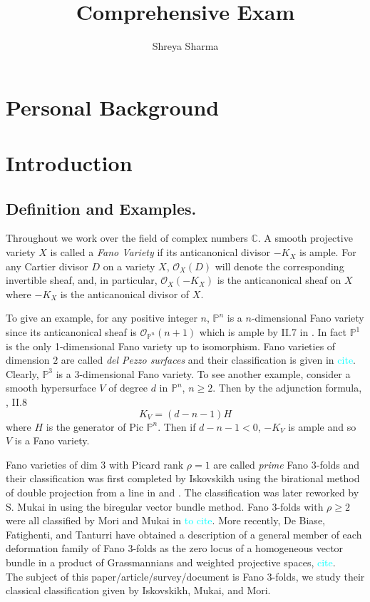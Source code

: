 \documentclass[11pt]{amsart}
\theoremstyle{plain}
\theoremstyle{definition}
\theoremstyle{expl}
\begin{document}
	\title{Comprehensive Exam}
	\date{}
	\author{\small{Shreya Sharma}}
	\maketitle
	\tableofcontents
	
\section{Personal Background}

\section{Introduction}
\subsection{Definition and Examples.} Throughout we work over the field of complex numbers $\mathbb{C}$.
A smooth projective variety $X$ is called a \textit{Fano Variety} if its anticanonical divisor $-K_X$ is ample.
For any Cartier divisor $D$ on a variety $X$, $\mathcal{O}_X(D)$ will denote the corresponding invertible sheaf, and, in particular, $\mathcal{O}_X(-K_X)$ is the anticanonical sheaf on $X$ where $-K_X$ is the anticanonical divisor of $X$. 

	To give an example, for any positive integer $n$,  $\mathbb{P}^n$ is a $n$-dimensional Fano variety since its anticanonical sheaf is $\mathcal{O}_{\mathbb{P}^n}(n+1)$ which is ample by II.7 in \cite{Hartshorne}. In fact $\mathbb{P}^1$ is the only 1-dimensional Fano variety up to isomorphism. Fano varieties of dimension $2$ are called \textit{del Pezzo surfaces} and their classification is given in \textcolor{cyan}{cite}. Clearly, $\mathbb{P}^3$ is a $3$-dimensional Fano variety. To see another example, consider a smooth hypersurface $V$ of degree $d$ in $\mathbb{P}^n$, $n \geq 2$. Then by the adjunction formula, \cite{Hartshorne}, II.8
	\[
	K_V = (d-n-1)H
	\]
    where $H$ is the generator of Pic $\mathbb{P}^n$. Then if $d-n-1 <0$, $-K_V$ is ample and so $V$ is a Fano variety.
    
 Fano varieties of dim $3$ with Picard rank $\rho =1$ are called \textit{prime} Fano $3$-folds and their classification was first completed by Iskovskikh using the birational method of double projection from a line in \cite{Isk77} and \cite{Isk78}. The classification was later reworked by S. Mukai in \cite{Muk89} using the biregular vector bundle method. Fano $3$-folds with $\rho\geq 2$ were all classified by Mori and Mukai in \textcolor{cyan}{to cite}. More recently, De Biase, Fatighenti, and Tanturri have obtained a description of a general member of each deformation family of Fano $3$-folds as the zero locus of a homogeneous vector bundle in a product of Grassmannians and weighted projective spaces, \textcolor{cyan}{cite}.\\
The subject of this paper/article/survey/document is Fano $3$-folds, we study their classical classification given by Iskovskikh, Mukai, and Mori. 
\end{document}
